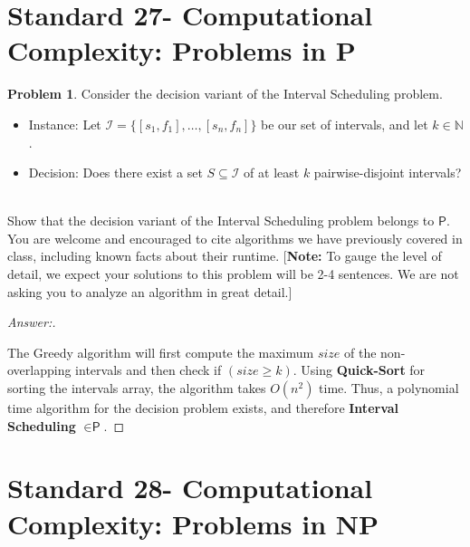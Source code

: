 \documentclass[11pt]{article}
\theoremstyle{definition}
\theoremstyle{definition}
\newtheorem{required}{Problem}
\theoremstyle{definition}
\begin{document}
\newpage
\section{Standard 27- Computational Complexity: Problems in \textsf{P}}

\begin{required}
Consider the decision variant of the \textsf{Interval Scheduling} problem.
\begin{itemize}
\item \textsf{Instance:} Let $\mathcal{I} = \{ [s_{1}, f_{1}], \ldots, [s_{n}, f_{n}] \}$ be our set of intervals, and let $k \in \mathbb{N}$.

\item \textsf{Decision:} Does there exist a set $S \subseteq \mathcal{I}$ of at least $k$ pairwise-disjoint intervals?
\end{itemize}


\noindent \\ Show that the decision variant of the \textsf{Interval Scheduling} problem belongs to $\textsf{P}$. You are welcome and encouraged to cite algorithms we have previously covered in class, including known facts about their runtime. [\textbf{Note:} To gauge the level of detail, we expect your solutions to this problem will be 2-4 sentences. We are not asking you to analyze an algorithm in great detail.]
\end{required}
 

\begin{proof}[Answer:] \
\item The Greedy algorithm will first compute the maximum $size$ of the non-overlapping intervals and then check if $(size \geq k)$. Using \textbf{Quick-Sort} for sorting the intervals array, the algorithm takes $O(n^{2})$ time. Thus, a polynomial time algorithm for the decision problem exists, and therefore \textbf{Interval Scheduling} $ \in \textsf{P}$.

\end{proof}







\newpage
\section{Standard 28- Computational Complexity: Problems in \textsf{NP}}
\end{document}

